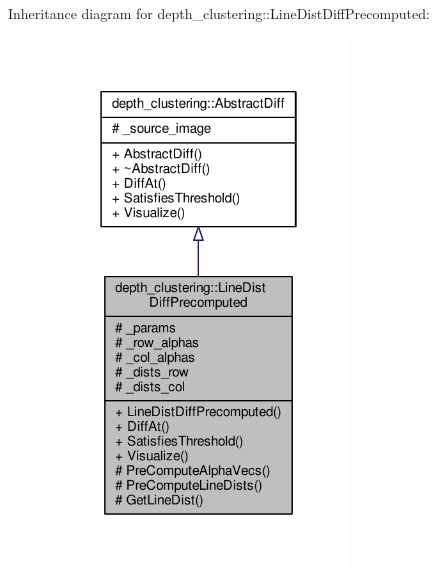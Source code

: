 Inheritance diagram for depth\-\_\-clustering\-:\-:Line\-Dist\-Diff\-Precomputed\-:
\nopagebreak
\begin{figure}[H]
\begin{center}
\leavevmode
\includegraphics[width=226pt]{classdepth__clustering_1_1LineDistDiffPrecomputed__inherit__graph}
\end{center}
\end{figure}



